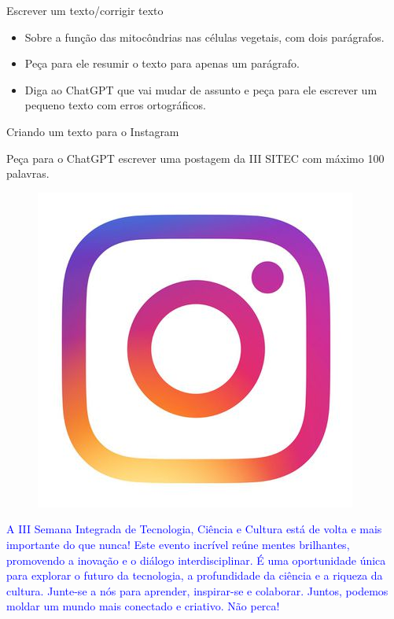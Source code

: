 \documentclass{beamer}
\begin{document}
\begin{frame}{Escrever um texto/corrigir texto}
\begin{itemize}\itemsep=1cm
    \item Sobre a função das mitocôndrias nas células vegetais, com dois parágrafos.
    \pause
    \item Peça para ele resumir o texto para apenas um parágrafo.
    \pause
    \item Diga ao ChatGPT que vai mudar de assunto e peça para ele escrever um pequeno texto com erros ortográficos.
\end{itemize}
\end{frame}

\begin{frame}{Criando um texto para o Instagram}

Peça para o ChatGPT escrever uma postagem da III SITEC com máximo 100 palavras.

\begin{figure}
\centering
\includegraphics[scale=0.1]{figuras/instagram.jpeg}
\end{figure}

 \textcolor{blue}{A III Semana Integrada de Tecnologia, Ciência e Cultura está de volta e mais importante do que nunca! Este evento incrível reúne mentes brilhantes, promovendo a inovação e o diálogo interdisciplinar. É uma oportunidade única para explorar o futuro da tecnologia, a profundidade da ciência e a riqueza da cultura. Junte-se a nós para aprender, inspirar-se e colaborar. Juntos, podemos moldar um mundo mais conectado e criativo. Não perca!}
 

\end{frame}
\end{document}
